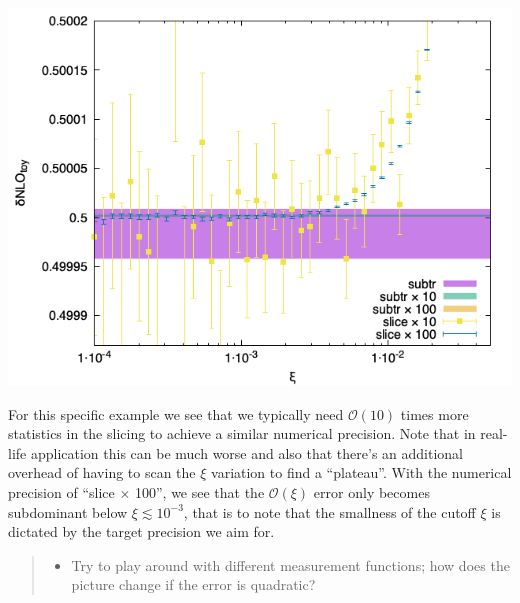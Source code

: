 \documentclass[11pt]{article}
\begin{document}
\begin{center}
\includegraphics[width=.9\linewidth]{data_zoom.png}
\label{}
\end{center}
For this specific example we see that we typically need \(\mathcal{O}(10)\) times more statistics in the slicing to achieve a similar numerical precision.
Note that in real-life application this can be much worse and also that there's an additional overhead of having to scan the \(\xi\) variation to find a ``plateau''.
With the numerical precision of ``slice \(\times\) 100'', we see that the \(\mathcal{O}(\xi)\) error only becomes subdominant below \(\xi \lesssim 10^{-3}\), that is to note that the smallness of the cutoff \(\xi\) is dictated by the target precision we aim for.

\begin{quote}
\begin{itemize}
\item Try to play around with different measurement functions; how does the picture change if the error is quadratic?
\end{itemize}
\end{quote}
\end{document}
